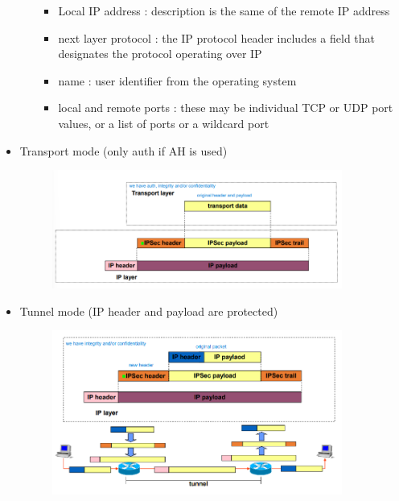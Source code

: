 \documentclass{article}
\begin{document}
\begin{itemize}
\begin{itemize}
\begin{itemize}
            \item Local IP address : description is the same of the remote IP address
            \item next layer protocol : the IP protocol header includes a field that designates the protocol operating over IP
            \item name : user identifier from the operating system
            \item local and remote ports : these may be individual TCP or UDP port values, or a list of ports or a wildcard port
        \end{itemize}
    \end{itemize}


    \item Transport mode (only auth if AH is used)
    \begin{figure}[h]
    \centering
    \includegraphics[width=0.90\textwidth]{figure/transport.png}
\end{figure}
    \item Tunnel mode (IP header and payload are protected)
    \begin{figure}[h]
    \centering
    \includegraphics[width=0.90\textwidth]{figure/tunnel.png}
    \end{figure}
    \begin{figure}[h]

\end{figure}
\end{itemize}
\end{document}
